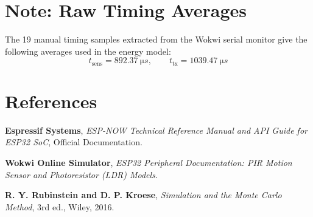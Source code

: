 \documentclass[11pt,a4paper]{article}
\begin{document}
\appendix
\section{Note: Raw Timing Averages}
The 19 manual timing samples extracted from the Wokwi serial monitor give the following averages used in the energy model:
\[
t_{\mathrm{sens}} = \SI{892.37}{\micro s}, \qquad t_{\mathrm{tx}} = \SI{1039.47}{\micro s}
\]
\section*{References}

\begin{enumerate}[label={[}\arabic*{]}]
    \item \textbf{Espressif Systems}, \textit{ESP-NOW Technical Reference Manual and API Guide for ESP32 SoC}, Official Documentation.
    \item \textbf{Wokwi Online Simulator}, \textit{ESP32 Peripheral Documentation: PIR Motion Sensor and Photoresistor (LDR) Models}.
    \item \textbf{R. Y. Rubinstein and D. P. Kroese}, \textit{Simulation and the Monte Carlo Method}, 3rd ed., Wiley, 2016.
\end{enumerate}
\end{document}
